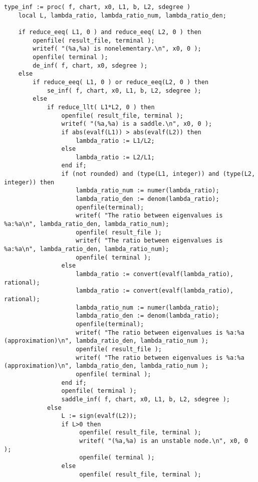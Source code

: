 \documentclass[a4paper,10pt]{article}
\begin{document}
\begin{lstlisting}[name=infinity]
type_inf := proc( f, chart, x0, L1, b, L2, sdegree )
    local L, lambda_ratio, lambda_ratio_num, lambda_ratio_den;

    if reduce_eeq( L1, 0 ) and reduce_eeq( L2, 0 ) then
        openfile( result_file, terminal );
        writef( "(%a,%a) is nonelementary.\n", x0, 0 );
        openfile( terminal );
        de_inf( f, chart, x0, sdegree );
    else
        if reduce_eeq( L1, 0 ) or reduce_eeq(L2, 0 ) then
            se_inf( f, chart, x0, L1, b, L2, sdegree );
        else
            if reduce_llt( L1*L2, 0 ) then
                openfile( result_file, terminal );
                writef( "(%a,%a) is a saddle.\n", x0, 0 );
                if abs(evalf(L1)) > abs(evalf(L2)) then
                    lambda_ratio := L1/L2;
                else
                    lambda_ratio := L2/L1;
                end if;
                if (not rounded) and (type(L1, integer)) and (type(L2, integer)) then 
                    lambda_ratio_num := numer(lambda_ratio);
                    lambda_ratio_den := denom(lambda_ratio);
                    openfile(terminal);
                    writef( "The ratio between eigenvalues is %a:%a\n", lambda_ratio_den, lambda_ratio_num);
                    openfile( result_file );
                    writef( "The ratio between eigenvalues is %a:%a\n", lambda_ratio_den, lambda_ratio_num);
                    openfile( terminal );
                else
                    lambda_ratio := convert(evalf(lambda_ratio), rational);
                    lambda_ratio := convert(evalf(lambda_ratio), rational);
                    lambda_ratio_num := numer(lambda_ratio);
                    lambda_ratio_den := denom(lambda_ratio);
                    openfile(terminal);
                    writef( "The ratio between eigenvalues is %a:%a (approximation)\n", lambda_ratio_den, lambda_ratio_num );
                    openfile( result_file );
                    writef( "The ratio between eigenvalues is %a:%a (approximation)\n", lambda_ratio_den, lambda_ratio_num );
                    openfile( terminal );
                end if;
                openfile( terminal );
                saddle_inf( f, chart, x0, L1, b, L2, sdegree );
            else
                L := sign(evalf(L2));
                if L>0 then
                     openfile( result_file, terminal );
                     writef( "(%a,%a) is an unstable node.\n", x0, 0 );
                     openfile( terminal );
                else
                     openfile( result_file, terminal );

\end{lstlisting}
\end{document}
